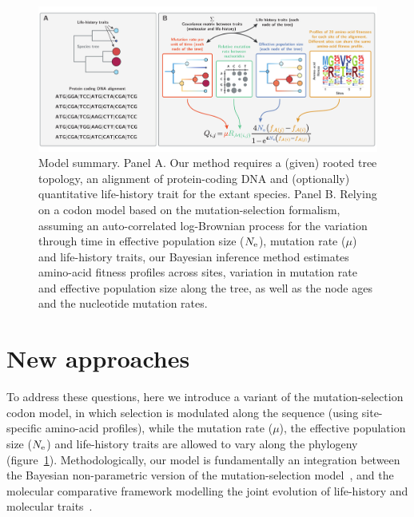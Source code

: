 \documentclass{article}
\begin{document}
    \begin{figure}[t]
        \begin{center}
            \includegraphics[width=\textwidth] {model_summary.pdf}
        \end{center}
        \caption[Model summary]{
            Model summary.
            Panel A.
            Our method requires a (given) rooted tree topology, an alignment of protein-coding DNA and (optionally) quantitative life-history trait for the extant species.
            Panel B.
            Relying on a codon model based on the mutation-selection formalism, assuming an auto-correlated log-Brownian process for the variation through time in effective population size ($N_{\text{e}}$), mutation rate ($\mu$) and life-history traits, our Bayesian inference method estimates amino-acid fitness profiles across sites, variation in mutation rate and effective population size along the tree, as well as the node ages and the nucleotide mutation rates.}
        \label{fig:modelSummary}
    \end{figure}

    \section{New approaches}
    \label{sec:NewApproaches}
    To address these questions, here we introduce a variant of the mutation-selection {codon} model, in which selection is modulated along the sequence (using site-specific amino-acid profiles), while the mutation rate ($\mu$), the {effective population size} ($N_{\text{e}}$) and life-history traits are allowed to vary along the phylogeny (figure~\ref{fig:modelSummary}).
    Methodologically, our model is fundamentally an integration between the Bayesian non-parametric version of the \citet{Halpern1998} mutation-selection model~\citep{Rodrigue2014}, and the molecular comparative framework modelling the joint evolution of life-history and molecular traits~\citep{Lartillot2011}.
\end{document}
